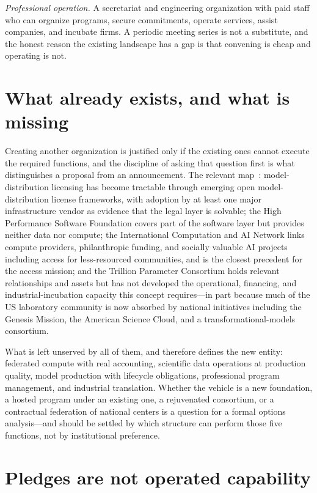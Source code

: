\emph{Professional operation.} A secretariat and engineering organization with paid staff who can organize programs, secure commitments, operate services, assist companies, and incubate firms. A periodic meeting series is not a substitute, and the honest reason the existing landscape has a gap is that convening is cheap and operating is not.

\section{What already exists, and what is missing}

Creating another organization is justified only if the existing ones cannot execute the required functions, and the discipline of asking that question first is what distinguishes a proposal from an announcement. The relevant map~\cite{consortium-record}: model-distribution licensing has become tractable through emerging open model-distribution license frameworks, with adoption by at least one major infrastructure vendor as evidence that the legal layer is solvable; the High Performance Software Foundation covers part of the software layer but provides neither data nor compute; the International Computation and AI Network links compute providers, philanthropic funding, and socially valuable AI projects including access for less-resourced communities, and is the closest precedent for the access mission; and the Trillion Parameter Consortium holds relevant relationships and assets but has not developed the operational, financing, and industrial-incubation capacity this concept requires---in part because much of the US laboratory community is now absorbed by national initiatives including the Genesis Mission, the American Science Cloud, and a transformational-models consortium.

What is left unserved by all of them, and therefore defines the new entity: federated compute with real accounting, scientific data operations at production quality, model production with lifecycle obligations, professional program management, and industrial translation. Whether the vehicle is a new foundation, a hosted program under an existing one, a rejuvenated consortium, or a contractual federation of national centers is a question for a formal options analysis---and should be settled by which structure can perform those five functions, not by institutional preference.

\section{Pledges are not operated capability}
\label{sec:sci-pledges}

